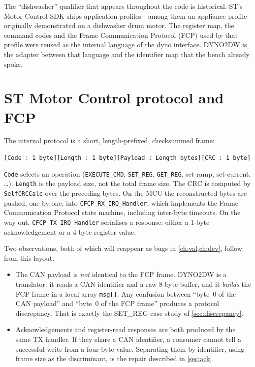 The ``dishwasher'' qualifier that appears throughout the code is historical.
ST's Motor Control SDK ships application profiles---among them an appliance
profile originally demonstrated on a dishwasher drum motor. The register
map, the command codes and the Frame Communication Protocol (FCP) used by
that profile were reused as the internal language of the dyno interface.
DYNO2DW is the adapter between that language and the identifier map that
the bench already spoke.

\section{ST Motor Control protocol and FCP}
\label{sec:mcp}

The internal protocol is a short, length-prefixed, checksummed frame:

\begin{center}
\texttt{[Code : 1 byte][Length : 1 byte][Payload : Length bytes][CRC : 1 byte]}
\end{center}

\texttt{Code} selects an operation (\texttt{EXECUTE\_CMD}, \texttt{SET\_REG},
\texttt{GET\_REG}, set-ramp, set-current, \ldots). \texttt{Length} is the
payload size, not the total frame size. The CRC is computed by
\texttt{SelfCRCCalc} over the preceding bytes. On the MCU the reconstructed
bytes are pushed, one by one, into
\texttt{CFCP\_RX\_IRQ\_Handler}, which implements the Frame Communication
Protocol state machine, including inter-byte timeouts. On the way out,
\texttt{CFCP\_TX\_IRQ\_Handler} serialises a response: either a 1-byte
acknowledgement or a 4-byte register value.

Two observations, both of which will reappear as bugs in
\cref{ch:val,ch:dev}, follow from this layout.

\begin{itemize}[leftmargin=1.6em]
  \item The CAN payload is \emph{not} identical to the FCP frame. DYNO2DW
        is a translator: it reads a CAN identifier and a raw 8-byte buffer,
        and it \emph{builds} the FCP frame in a local array \texttt{msg[]}.
        Any confusion between ``byte~0 of the CAN payload'' and ``byte~0 of
        the FCP frame'' produces a protocol discrepancy. That is exactly
        the SET\_REG case study of \cref{sec:discrepancy}.
  \item Acknowledgements and register-read responses are both produced by
        the same TX handler. If they share a CAN identifier, a consumer
        cannot tell a successful write from a four-byte value. Separating
        them by identifier, using frame size as the discriminant, is the
        repair described in \cref{sec:ack}.
\end{itemize}

